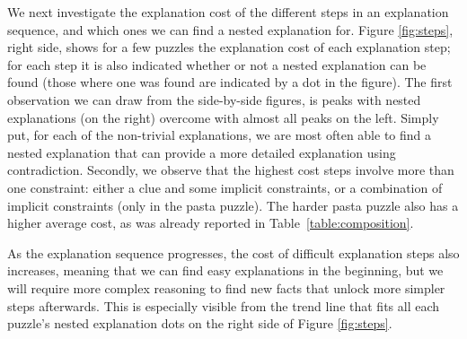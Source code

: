 We next investigate the explanation cost of the different steps in an explanation sequence, and which ones we can find a nested explanation for. 
Figure \ref{fig:steps}, right side, %
shows for a few puzzles the explanation cost of each explanation step; for each step it is also indicated whether or not a nested explanation can be found (those where one was found are indicated by a dot in the figure). 
The first observation we can draw from the side-by-side figures, is peaks with nested explanations (on the right) overcome with almost all peaks on the left. Simply put, for each of the non-trivial explanations, we are most often able to find a nested explanation that can provide a more detailed explanation using contradiction. 
Secondly, we observe that the highest cost steps involve more than one constraint: either a clue and some implicit constraints, or a combination of implicit constraints (only in the pasta puzzle). 
The harder pasta puzzle also has a higher average cost, as was already reported in Table~\ref{table:composition}. 

As the explanation sequence progresses, the cost of difficult explanation steps also increases, meaning that we can find easy explanations in the beginning, but we will require more complex reasoning to find new facts that unlock more simpler steps afterwards. 
This is especially visible from the trend line that fits all each puzzle's nested explanation dots on the right side of Figure \ref{fig:steps}. 




